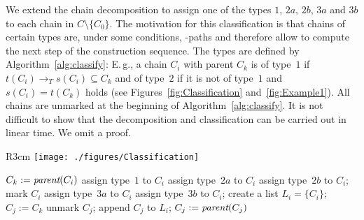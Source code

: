 We extend the chain decomposition to assign one of the types $1$, $2a$, $2b$, $3a$ and $3b$ to each chain in $C \setminus \{C_0\}$. The motivation for this classification is that chains of certain types are, under some conditions, \BG-paths and therefore allow to compute the next step of the construction sequence. The types are defined by Algorithm~\ref{alg:classify}: E.\,g., a chain $C_i$ with parent $C_k$ is of type~$1$ if $t(C_i) \rightarrow_T s(C_i) \subseteq C_k$ and of type~$2$ if it is not of type~$1$ and $s(C_i)=t(C_k)$ holds (see Figures~\ref{fig:Classification} and~\ref{fig:Example1}). All chains are unmarked at the beginning of Algorithm~\ref{alg:classify}. It is not difficult to show that the decomposition and classification can be carried out in linear time. We omit a proof.

\begin{wrapfigure}[12]{R}{3cm}
	\vspace{-0.99cm}
	\centering
	\texttt{[image: ./figures/Classification]}
	\caption{$C_1$ and $C_2$ are of type~$1$, $C_3$ is of type~$2b$, $C_4$ of type~$2a$, $C_5$ of type~$3b$ and $C_6$ of type~$3a$.}
	\label{fig:Classification}
\end{wrapfigure}

\begin{algorithm}
\caption{classify$(C_i \in C \setminus \{C_0\}, \textrm{DFS-tree } T)$}\label{alg:classify}\begin{algorithmic}[1]
	\State $C_k := \emph{parent}(C_i)$
	\label{typeone}
		\State assign type~$1$ to $C_i$
			\State assign type~$2a$ to $C_i$
		\Else
			\State assign type~$2b$ to $C_i$; mark $C_i$
		\EndIf
	\Else {}
			\State assign type~$3a$ to $C_i$
		\Else {}
			\State assign type~$3b$ to $C_i$; create a list $L_i = \{C_i\}$; $C_j := C_k$\label{assign}
				\State unmark $C_j$; append $C_j$ to $L_i$; $C_j := \emph{parent}(C_j)$\label{unmarking}
			\EndWhile
		\EndIf
	\EndIf
\end{algorithmic}
\end{algorithm}


